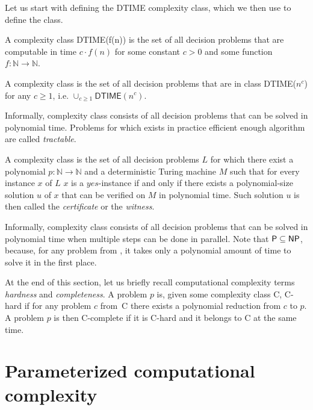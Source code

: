 Let us start with defining the \textsf{DTIME} complexity class, which we then use to define the \Po class.

\begin{definition}
    A complexity class \textsf{DTIME}(f(n)) is the set of all decision problems that are computable in time
    $c \cdot f(n)$ for some constant $c > 0$ and some function $f \colon \mathbb{N} \rightarrow \mathbb{N}$.
\end{definition}

\begin{definition}[\Po]
    A complexity class \Po is the set of all decision problems that are in class \textsf{DTIME}($n^c$)
    for any $c \geq 1$, i.e.
    $\cup_{c \geq 1} \textsf{DTIME}(n^c)$.
\end{definition}

Informally, complexity class \Po consists of all decision problems that can be solved in polynomial time.
Problems for which exists in practice efficient enough algorithm are called \emph{tractable}.

\begin{definition}[\NP]
    A complexity class \NP is the set of all decision problems $L$ for which there exist
    a polynomial $p \colon \mathbb{N} \rightarrow \mathbb{N}$ and a deterministic Turing machine $M$
    such that for every instance $x$ of $L$ $x$ is a $yes$-instance if and only if there exists
    a polynomial-size solution $u$ of $x$ that can be verified on $M$ in polynomial time.
    Such solution $u$ is then called the \emph{certificate} or the \emph{witness}.
\end{definition}

Informally, complexity class \NP consists of all decision problems that can be solved in polynomial time
when multiple steps can be done in parallel.
Note that $\textsf{P} \subseteq \textsf{NP}$, because, for any problem from \Po, it takes only a polynomial amount of time to solve
it in the first place.

At the end of this section, let us briefly recall computational complexity terms \emph{hardness} and \emph{completeness}.
A problem $p$ is, given some complexity class \textsf{C}, \textsf{C-hard} if for any problem $c$ from~\textsf{C}
there exists a polynomial reduction from $c$ to $p$.
A problem $p$ is then \textsf{C-complete} if it is \textsf{C-hard} and it belongs to \textsf{C} at the same time.


\section{Parameterized computational complexity}\label{section:ParamComp}

